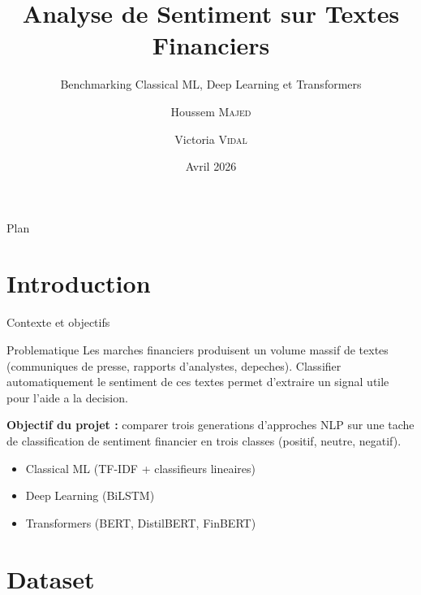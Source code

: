 \documentclass[aspectratio=169, 11pt]{beamer}
\title[Sentiment Analysis]{Analyse de Sentiment sur Textes Financiers}
\subtitle{Benchmarking Classical ML, Deep Learning et Transformers}
\author[Majed \& Vidal]{Houssem \textsc{Majed} \and Victoria \textsc{Vidal}}
\institute[Paris 1]{Universit\'e Paris 1 Panth\'eon-Sorbonne\\Master IASD -- Deep Learning / NLP}
\date{Avril 2026}
\begin{document}
\begin{frame}[plain]
  \titlepage
\end{frame}

\begin{frame}{Plan}
  \tableofcontents
\end{frame}

\section{Introduction}

\begin{frame}{Contexte et objectifs}
  \begin{block}{Problematique}
    Les marches financiers produisent un volume massif de textes (communiques de presse,
    rapports d'analystes, depeches). Classifier automatiquement le sentiment de ces
    textes permet d'extraire un signal utile pour l'aide a la decision.
  \end{block}
  \vspace{0.3cm}
  \textbf{Objectif du projet :} comparer trois generations d'approches NLP sur une
  tache de classification de sentiment financier en trois classes (positif, neutre, negatif).
  \vspace{0.3cm}
  \begin{itemize}
    \item Classical ML (TF-IDF + classifieurs lineaires)
    \item Deep Learning (BiLSTM)
    \item Transformers (BERT, DistilBERT, FinBERT)
  \end{itemize}
\end{frame}

\section{Dataset}
\end{document}
